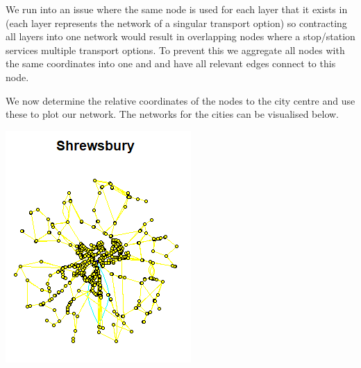 We run into an issue where the same node is used for each layer that it exists in (each layer represents the network of a singular transport option) so contracting all layers into one network would result in overlapping nodes where a stop/station services multiple transport options. To prevent this we aggregate all nodes with the same coordinates into one and and have all relevant edges connect to this node.

We now determine the relative coordinates of the nodes to the city centre and use these to plot our network. The networks for the cities can be visualised below. \cite{chatgpt2025}

\newpage

\vspace*{\fill} %

\begin{center}
  \begin{minipage}{0.45\textwidth}
    \centering
    \includegraphics[width=\linewidth]{images/ShrewsburyMAP.png}

\end{minipage}
\end{center}
